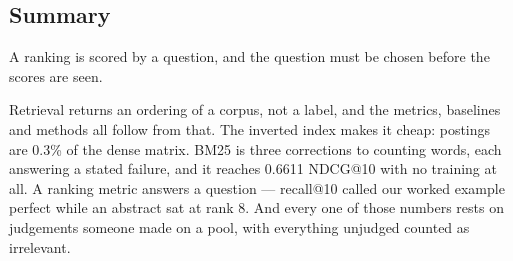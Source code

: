 \documentclass[11pt,a4paper]{article}
\begin{document}
\subsection{Summary}

\begin{keybox}[title={One line to keep}]
A ranking is scored by a question, and the question must be chosen before the
scores are seen.
\end{keybox}

Retrieval returns an ordering of a corpus, not a label, and the metrics,
baselines and methods all follow from that. The inverted index makes it cheap:
postings are 0.3\% of the dense matrix. BM25 is three corrections to counting
words, each answering a stated failure, and it reaches 0.6611 NDCG@10 with no
training at all. A ranking metric answers a question --- recall@10 called our
worked example perfect while an abstract sat at rank 8. And every one of those
numbers rests on judgements someone made on a pool, with everything unjudged
counted as irrelevant.
\end{document}
